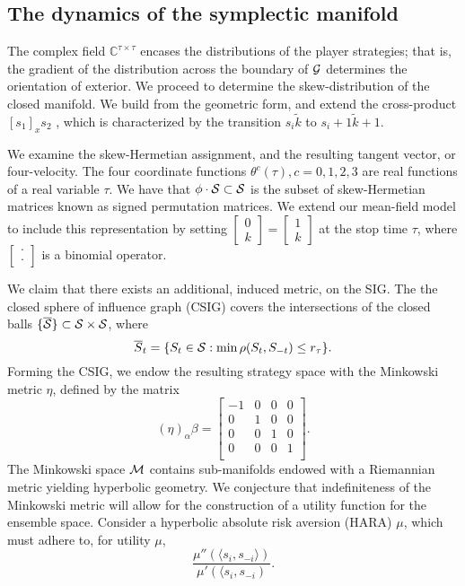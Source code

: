 \subsection{The dynamics of the symplectic manifold}

The complex field $\mathbb{C}^{\tau\times\tau}$ encases the distributions of the
player strategies; that is, the gradient of the distribution across the boundary
of $\mathcal{G}$ determines the orientation of exterior. 
We proceed to determine the skew-distribution of the closed manifold. We build from the geometric form, and
extend the cross-product $[s_1 ]_x s_2$ , which is characterized by the
transition $s_i \tilde k$ to $s_i+1 \tilde k + 1$.

We examine the skew-Hermetian assignment, and the resulting tangent vector, or four-velocity. 
The four coordinate functions $\theta^c (\tau), c = 0, 1, 2, 3$ are real
functions of a real variable $\tau$. 
We have that $\phi\cdot \mathcal{S}\subset \mathcal{S}$ is the subset of skew-Hermetian matrices known as signed
permutation matrices. We extend our mean-field model to include this
representation by setting $\begin{bmatrix}0 \\ k\end{bmatrix} = \begin{bmatrix}1
\\ k\end{bmatrix}$ at the stop time $\tau$, where $\begin{bmatrix} \cdot \\
\cdot\end{bmatrix}$ is a binomial operator.

We claim that there exists an additional, induced metric, on the
SIG. The the closed sphere of influence graph (CSIG) covers the intersections
of the closed balls $\lbrace\overline{\mathcal{S}}\rbrace \subset \mathcal{S}\times \mathcal{S}$, where
$$
    \overline{S}_t= \lbrace S_t \in \mathcal{S} : \min\rho(S_t, S_{-t}) \le r_\tau \rbrace.
$$
Forming the CSIG,
we endow the resulting strategy space with the Minkowski metric $\eta$, defined by the matrix
$$
	(\eta)_\alpha\beta = \begin{bmatrix}
		-1 & 0 & 0 & 0 \\
		0 & 1 & 0 & 0 \\
		0 & 0 & 1 & 0 \\
		0 & 0 & 0 & 1 \\
	\end{bmatrix}.
$$
The Minkowski space $\mathcal{M}$ contains sub-manifolds endowed with a Riemannian metric yielding hyperbolic geometry. 
We conjecture that indefiniteness of the Minkowski metric will allow for the
construction of a utility function for the ensemble space. 
Consider a hyperbolic absolute risk aversion (HARA) $\mu$, which must adhere to,
for utility $\mu$,
$$
    \displaystyle\frac{\mu''(\langle s_i,s_{-i}\rangle)}{\mu'(\langle s_i,
    s_{-i})}.
$$

